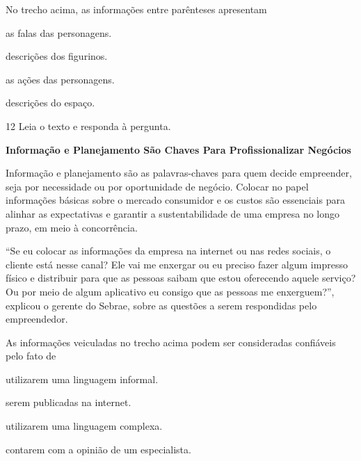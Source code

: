 No trecho acima, as informações entre parênteses apresentam

\begin{multicols}{2}
\begin{escolha}
  \item as falas das personagens.

  \item descrições dos figurinos.

  \item as ações das personagens.

  \item descrições do espaço.
\end{escolha}
\end{multicols}

\num{12} Leia o texto e responda à pergunta.
\enlargethispage{3\baselineskip}

\begin{myquote}
\textbf{Informação e Planejamento São Chaves Para Profissionalizar Negócios}

Informação e planejamento são as palavras-chaves para quem decide
empreender, seja por necessidade ou por oportunidade de negócio. Colocar
no papel informações básicas sobre o mercado consumidor e os custos são
essenciais para alinhar as expectativas e garantir a sustentabilidade de
uma empresa no longo prazo, em meio à concorrência.

``Se eu colocar as informações da empresa na internet ou nas redes
sociais, o cliente está nesse canal? Ele vai me enxergar ou eu preciso
fazer algum impresso físico e distribuir para que as pessoas saibam que
estou oferecendo aquele serviço? Ou por meio de algum aplicativo eu
consigo que as pessoas me enxerguem?'', explicou o gerente do Sebrae,
sobre as questões a serem respondidas pelo empreendedor.

\end{myquote}

\pagebreak
As informações veiculadas no trecho acima podem ser consideradas
confiáveis pelo fato de

\begin{escolha}
  \item utilizarem uma linguagem informal.

  \item serem publicadas na internet.

  \item utilizarem uma linguagem complexa.

  \item contarem com a opinião de um especialista.
\end{escolha}

